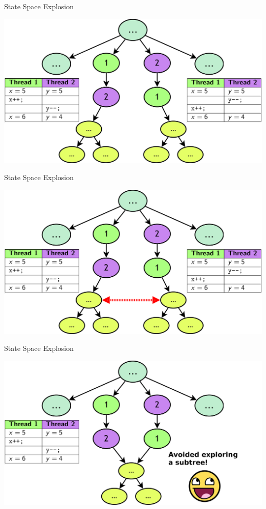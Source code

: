 \documentclass[xcolor=dvipsnames]{beamer}
\begin{document}
\begin{frame}{State Space Explosion}
	\begin{center}
	\includegraphics[width=\textwidth]{undiamond0.png}
	\end{center}
\end{frame}
\begin{frame}{State Space Explosion}
	\begin{center}
	\includegraphics[width=\textwidth]{undiamond1.png}
	\end{center}
\end{frame}
\begin{frame}{State Space Explosion}
	\begin{center}
	\includegraphics[width=\textwidth]{diamond1.png}
	\end{center}
\end{frame}
\end{document}

